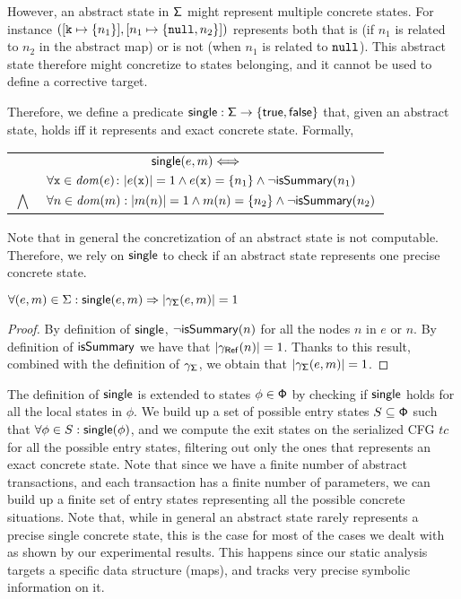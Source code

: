 However, an abstract state in $\mathsf{\Sigma}$ might represent multiple concrete states. For instance $([\mathtt{k} \mapsto \{n_1\}], [n_1 \mapsto \{\mathtt{null}, n_2\}])$ represents both that   is (if $n_1$ is related to $n_2$ in the abstract map) or is not (when $n_1$ is related to $\mathtt{null}$). This abstract state therefore might concretize to states belonging, and it cannot be used to define a corrective target.

Therefore, we define a predicate $\mathsf{single} : \mathsf{\Sigma} \to \{\mathsf{true}, \mathsf{false}\}$ that, given an abstract state, holds iff it represents and exact concrete state. Formally,\\ 
\footnotesize
\begin{tabular}{rl}
	\multicolumn{2}{c}{$\mathsf{single}(e, m) \Longleftrightarrow$} \\
	& $\forall \mathtt{x} \in \mathit{dom}(e) \colon |e(\mathtt{x})|=1 \land e(\mathtt{x})=\{n_1\} \land \neg \mathsf{isSummary}(n_1)$ \\
	$\bigwedge$ & $\forall n \in \mathit{dom}(m) : |m(n)|=1 \land m(n)=\{n_2\} \land \neg \mathsf{isSummary}(n_2)$
\end{tabular}
\normalsize
Note that in general the concretization of an abstract state is not computable. Therefore, we rely on $\mathsf{single}$ to check if an abstract state represents one precise concrete state.

\begin{lemma}
	\label{lemma:singleconcretization}
	$\forall (e, m) \in \Sigma : \mathsf{single}(e, m) \Rightarrow |\gamma_{\mathsf{\Sigma}}(e, m)|=1$
\end{lemma}
\begin{proof}
 By definition of $\mathsf{single}$, $\neg \mathsf{isSummary}(n)$ for all the nodes $n$ in $e$ or $n$. By definition of $\mathsf{isSummary}$ we have that $|\gamma_{\mathsf{Ref}}(n)|=1$. Thanks to this result, combined with the definition of $\gamma_{\mathsf{\Sigma}}$, we obtain that $|\gamma_{\mathsf{\Sigma}}(e, m)|=1$.
\end{proof}

The definition of $\mathsf{single}$ is extended to states $\phi \in \mathsf{\mathsf{\Phi}}$ by checking if $\mathsf{single}$ holds for all the local states in $\phi$. 
We build up a set of possible entry states $S \subseteq \mathsf{\mathsf{\Phi}}$ such that $\forall \phi \in S : \mathsf{single}(\phi)$, and we compute the exit states on the serialized CFG $tc$ for all the possible entry states, filtering out only the ones that represents an exact concrete state. Note that since we have a finite number of abstract transactions, and each transaction has a finite number of parameters, we can build up a finite set of entry states representing all the possible concrete situations. Note that, while in general an abstract state rarely represents a precise single concrete state, this is the case for most of the cases we dealt with as shown by our experimental results. This happens since our static analysis targets a specific data structure (maps), and tracks very precise symbolic information on it.

